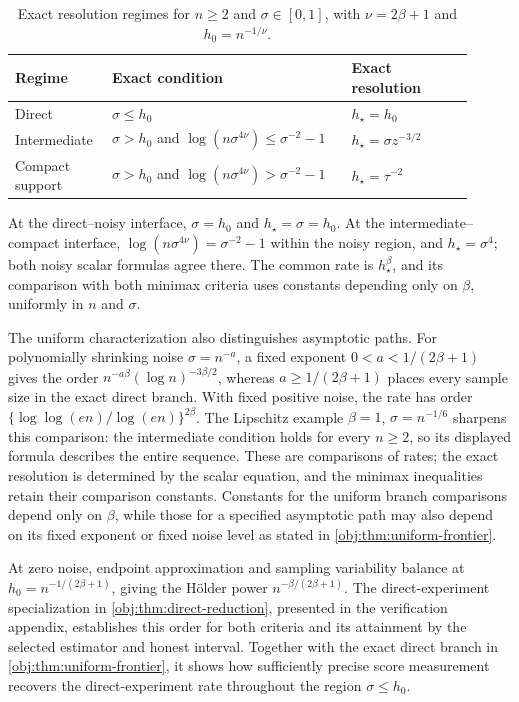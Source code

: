 \begin{table}[htbp]
\centering
\caption{Exact resolution regimes for \(n\ge2\) and \(\sigma\in[0,1]\), with \(\nu=2\beta+1\) and \(h_0=n^{-1/\nu}\).}
\label{tab:noise-regimes}
\begin{tabular}{@{}p{0.17\linewidth}p{0.49\linewidth}p{0.25\linewidth}@{}}
\hline
Regime & Exact condition & Exact resolution \\
\hline
Direct &
\(\sigma\le h_0\) &
\(h_\star=h_0\) \\[0.6em]
Intermediate &
\(\sigma>h_0\) and
\(\log(n\sigma^{4\nu})\le\sigma^{-2}-1\) &
\(h_\star=\sigma z^{-3/2}\) \\[0.6em]
Compact support &
\(\sigma>h_0\) and
\(\log(n\sigma^{4\nu})>\sigma^{-2}-1\) &
\(h_\star=\tau^{-2}\) \\
\hline
\end{tabular}

\smallskip
\parbox{0.95\linewidth}{\small
At the direct--noisy interface, \(\sigma=h_0\) and \(h_\star=\sigma=h_0\).
At the intermediate--compact interface,
\(\log(n\sigma^{4\nu})=\sigma^{-2}-1\) within the noisy region, and
\(h_\star=\sigma^4\); both noisy scalar formulas agree there.
The common rate is \(h_\star^\beta\), and its comparison with both minimax criteria uses constants depending only on \(\beta\), uniformly in \(n\) and \(\sigma\).}
\end{table}

The uniform characterization also distinguishes asymptotic paths. For polynomially shrinking noise \(\sigma=n^{-a}\), a fixed exponent \(0<a<1/(2\beta+1)\) gives the order \(n^{-a\beta}(\log n)^{-3\beta/2}\), whereas \(a\ge1/(2\beta+1)\) places every sample size in the exact direct branch. With fixed positive noise, the rate has order \(\{\log\log(en)/\log(en)\}^{2\beta}\). The Lipschitz example \(\beta=1\), \(\sigma=n^{-1/6}\) sharpens this comparison: the intermediate condition holds for every \(n\ge2\), so its displayed formula describes the entire sequence. These are comparisons of rates; the exact resolution is determined by the scalar equation, and the minimax inequalities retain their comparison constants. Constants for the uniform branch comparisons depend only on \(\beta\), while those for a specified asymptotic path may also depend on its fixed exponent or fixed noise level as stated in \cref{obj:thm:uniform-frontier}.

At zero noise, endpoint approximation and sampling variability balance at \(h_0=n^{-1/(2\beta+1)}\), giving the Hölder power \(n^{-\beta/(2\beta+1)}\). The direct-experiment specialization in \cref{obj:thm:direct-reduction}, presented in the verification appendix, establishes this order for both criteria and its attainment by the selected estimator and honest interval. Together with the exact direct branch in \cref{obj:thm:uniform-frontier}, it shows how sufficiently precise score measurement recovers the direct-experiment rate throughout the region \(\sigma\le h_0\).
